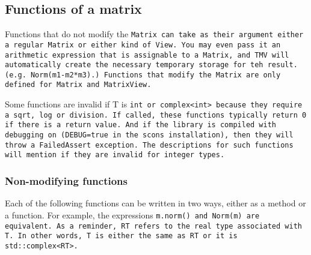 \subsection{Functions of a matrix}
\label{Matrix_Functions}

Functions that do not modify the \tt{Matrix} 
can take as their argument either a regular \tt{Matrix} or either kind
of \tt{View}.  You may even pass it an arithmetic expression that is
assignable to a \tt{Matrix}, and TMV will automatically create the 
necessary temporary storage for teh result.  (e.g. \tt{Norm(m1-m2*m3)}.)
Functions that modify the \tt{Matrix} are only defined for 
\tt{Matrix} and \tt{MatrixView}.

Some functions are invalid if T is \tt{int} or \tt{complex<int>} because they require 
a \tt{sqrt}, \tt{log} or division.  If called, these functions typically return \tt{0} if there is a return value.
And if the library is compiled with debugging on (\tt{DEBUG=true} in the scons installation),
then they will throw a \tt{FailedAssert} exception.  The descriptions for such functions
will mention if they are invalid for integer types.

\subsubsection{Non-modifying functions}

Each of the following functions can be written in two ways,
either as a method or a function.
For example, the expressions \tt{m.norm()} and \tt{Norm(m)}
are equivalent.  
As a reminder, \tt{RT} refers to the real type associated with \tt{T}.
In other words, \tt{T} is either the same as \tt{RT} or it is
\tt{std::complex<RT>}.

